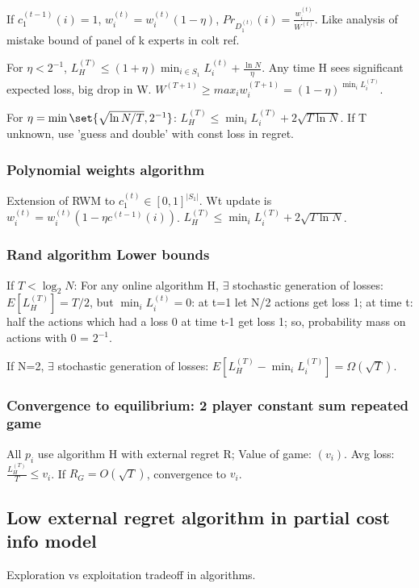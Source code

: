 \documentclass[oneside, article]{memoir}
\begin{document}
If $c_{1}^{(t-1)}(i) = 1$, $w_{i}^{(t)} = w_{i}^{(t)}(1-\eta)$, $Pr_{D_{1}^{(t)}}(i) = \frac{w_{i}^{(t)}}{W^{(t)}}$. \why Like analysis of mistake bound of panel of k experts in colt ref.

For $\eta < 2^{-1}$, $L_{H}^{(T)} \leq (1+ \eta) \min_{i \in S_{1}}L_{i}^{(t)} + \frac{\ln N}{\eta}$. Any time H sees significant expected loss, big drop in W. $W^{(T+1)} \geq max_{i}w_{i}^{(T+1)} = (1-\eta)^{\min_{i}L_{i}^{(T)}}$. \tbc

For $\eta = \min \set{\sqrt{\ln N/ T}, 2^{-1}}$: $L_{H}^{(T)} \leq \min_{i} L_{i}^{(T)} + 2\sqrt{T\ln N}$. If T unknown, use 'guess and double' with const loss in regret. \why

\subsubsection{Polynomial weights algorithm}
Extension of RWM to $c_{1}^{(t)} \in [0,1]^{|S_{1}|}$. Wt update is $w_{i}^{(t)} = w_{i}^{(t)}(1-\eta c^{(t-1)}(i))$. $L_{H}^{(T)} \leq \min_{i} L_{i}^{(T)} + 2\sqrt{T\ln N}$. \why

\subsubsection{Rand algorithm Lower bounds}
If $T <  \log_{2} N$: For any online algorithm H, $\exists$ stochastic generation of losses: $E[L_{H}^{(T)}] = T/2$, but $\min_{i} L_{i}^{(t)} = 0$: at t=1 let N/2 actions get loss 1; at time t: half the actions which had a loss 0 at time t-1 get loss 1; so, probability mass on actions with 0 = $2^{-1}$.

If N=2, $\exists$ stochastic generation of losses: $E[L_{H}^{(T)} - \min_{i} L_{i}^{(T)}] = \Omega(\sqrt{T})$. \why

\subsubsection{Convergence to equilibrium: 2 player constant sum repeated game}
All $p_{i}$ use algorithm H with external regret R; Value of game: $(v_{i})$. Avg loss: $\frac{L_{H}^{(T)}}{T} \leq v_{i}$. \why If $R_{G} = O(\sqrt{T})$, convergence to $v_{i}$.


\subsection{Low external regret algorithm in partial cost info model}
Exploration vs exploitation tradeoff in algorithms.
\end{document}
